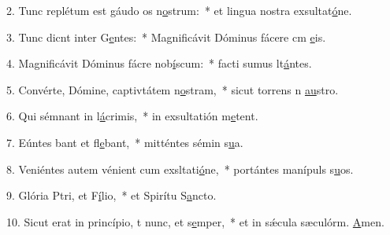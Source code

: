 2. Tunc replétum est gáudo os n\uline{o}strum:~* et lingua nostra exsultat\uline{ó}ne.\par 
3. Tunc dicnt inter G\uline{e}ntes:~* Magnificávit Dóminus fácere cm \uline{e}is.\par 
4. Magnificávit Dóminus fácre nob\uline{í}scum:~* facti sumus lt\uline{á}ntes.\par 
5. Convérte, Dómine, captivtátem n\uline{o}stram,~* sicut torrens n \uline{au}stro.\par 
6. Qui sémnant in l\uline{á}crimis,~* in exsultatión m\uline{e}tent.\par 
7. Eúntes bant et fl\uline{e}bant,~* mitténtes sémin s\uline{u}a.\par 
8. Veniéntes autem vénient cum exsltati\uline{ó}ne,~* portántes manípuls s\uline{u}os.\par 
9. Glória Ptri, et F\uline{í}lio,~* et Spirítu S\uline{a}ncto.\par 
10. Sicut erat in princípio, t nunc, et s\uline{e}mper,~* et in sǽcula sæculórm. \uline{A}men.\par 
